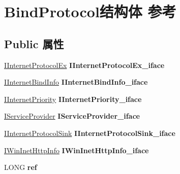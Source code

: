 \hypertarget{struct_bind_protocol}{}\section{Bind\+Protocol结构体 参考}
\label{struct_bind_protocol}
\subsection*{Public 属性}
\begin{DoxyCompactItemize}
\item 
\mbox{\label{struct_bind_protocol_a193652405abd1f4a9db22c7847b57fd0}} 
\hyperlink{interface_i_internet_protocol_ex}{I\+Internet\+Protocol\+Ex} {\bfseries I\+Internet\+Protocol\+Ex\+\_\+iface}
\item 
\mbox{\label{struct_bind_protocol_ab5b0c9451b39eb4fea1b3059d25792f2}} 
\hyperlink{interface_i_internet_bind_info}{I\+Internet\+Bind\+Info} {\bfseries I\+Internet\+Bind\+Info\+\_\+iface}
\item 
\mbox{\label{struct_bind_protocol_aeb2f41b92d81540e6ef9e587f784dbe6}} 
\hyperlink{interface_i_internet_priority}{I\+Internet\+Priority} {\bfseries I\+Internet\+Priority\+\_\+iface}
\item 
\mbox{\label{struct_bind_protocol_afa92fe6da802cfc784ac8a267946d1c9}} 
\hyperlink{interface_i_service_provider}{I\+Service\+Provider} {\bfseries I\+Service\+Provider\+\_\+iface}
\item 
\mbox{\label{struct_bind_protocol_af9ae015e4f3cc1ae5e7e94f04db084b5}} 
\hyperlink{interface_i_internet_protocol_sink}{I\+Internet\+Protocol\+Sink} {\bfseries I\+Internet\+Protocol\+Sink\+\_\+iface}
\item 
\mbox{\label{struct_bind_protocol_a74e8ab194385ec8d45e9a4eec145d5be}} 
\hyperlink{interface_i_win_inet_http_info}{I\+Win\+Inet\+Http\+Info} {\bfseries I\+Win\+Inet\+Http\+Info\+\_\+iface}
\item 
\mbox{\label{struct_bind_protocol_a54dae569252735671d425440c90b6448}} 
L\+O\+NG {\bfseries ref}
\item 

\end{DoxyCompactItemize}
